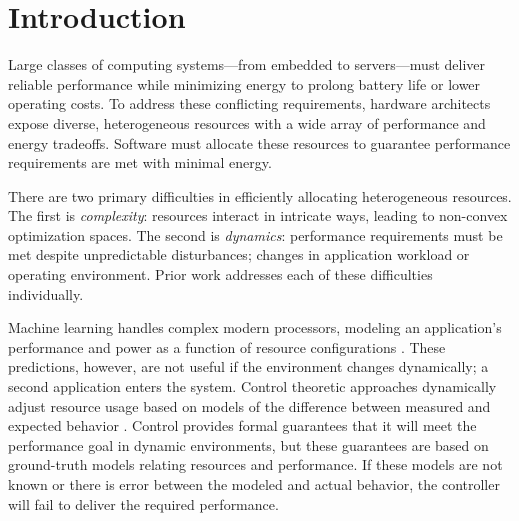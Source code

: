 \section{Introduction}
Large classes of computing systems---from embedded to servers---must
deliver reliable performance while minimizing energy to prolong
battery life or lower operating costs.  To address these conflicting
requirements, hardware architects expose diverse, heterogeneous
resources with a wide array of performance and energy tradeoffs.
Software must allocate these resources to guarantee performance
requirements are met with minimal energy.


There are two primary difficulties in efficiently allocating
heterogeneous resources.  The first is \emph{complexity}: resources
interact in intricate ways, leading to non-convex optimization spaces.
The second is \emph{dynamics}: perfor\-mance requirements must be met
despite unpredictable disturbances; \eg{} changes in application
workload or operating environment.  Prior work addresses each of these
difficulties individually.

Machine learning handles complex modern processors, modeling an
application's performance and power as a function of resource
configurations
\cite{reddiHPCA2013,dubach2010,Bitirgen2008,Ipek,Koala,LEO,Flicker,Ponamarev,Paragon}.
These predictions, however, are not useful if the environment changes
dynamically; \eg{} a second application enters the system.  Control
theoretic approaches dynamically adjust resource usage based on models
of the difference between measured and expected behavior
\cite{METE,Steere99,grace,Hellerstein2004a,Chen2011,POET,ControlWare,Agilos,grace2,JouleGuard}.
Control provides formal guarantees that it will meet the performance
goal in dynamic environments, but these guarantees are based on
ground-truth models relating resources and performance.  If these
models are not known or there is error between the modeled and actual
behavior, the controller will fail to deliver the required
performance.

